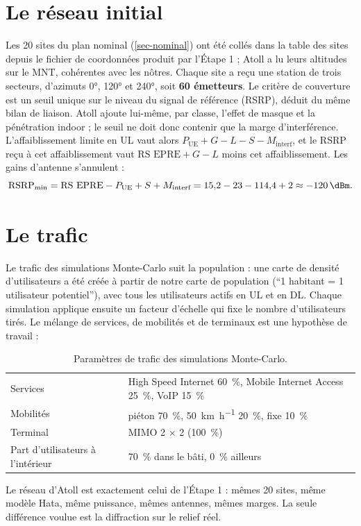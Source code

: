 \section{Le réseau initial}

Les 20 sites du plan nominal (\cref{sec-nominal}) ont été collés dans la table des sites depuis le fichier de coordonnées produit par l'Étape 1 ; Atoll a lu leurs altitudes sur le MNT, cohérentes avec les nôtres. Chaque site a reçu une station de trois secteurs, d'azimuts \ang{0}, \ang{120} et \ang{240}, soit \textbf{60 émetteurs}. Le critère de couverture est un seuil unique sur le niveau du signal de référence (RSRP), déduit du même bilan de liaison. Atoll ajoute lui-même, par classe, l'effet de masque et la pénétration indoor ; le seuil ne doit donc contenir que la marge d'interférence. L'affaiblissement limite en UL vaut alors $P_{\text{UE}} + G - L - S - M_{\text{interf}}$, et le RSRP reçu à cet affaiblissement vaut $\text{RS EPRE} + G - L$ moins cet affaiblissement. Les gains d'antenne s'annulent :
\begin{equation}
  \text{RSRP}_{\min} = \text{RS EPRE} - P_{\text{UE}} + S + M_{\text{interf}} = 15{,}2 - 23 - 114{,}4 + 2 \approx \SI{-120}{\dBm}.
\end{equation}

\section{Le trafic}

Le trafic des simulations Monte-Carlo suit la population : une carte de densité d'utilisateurs a été créée à partir de notre carte de population (\enquote{1 habitant = 1 utilisateur potentiel}), avec tous les utilisateurs actifs en UL et en DL. Chaque simulation applique ensuite un facteur d'échelle qui fixe le nombre d'utilisateurs tirés. Le mélange de services, de mobilités et de terminaux est une hypothèse de travail :

\begin{table}[H]
\centering
\caption{Paramètres de trafic des simulations Monte-Carlo.}
\label{tab-mix}
\begin{tabularx}{\textwidth}{@{}lL@{}}
\toprule
{} &  \\
\midrule
Services & High Speed Internet \SI{60}{\percent}, Mobile Internet Access \SI{25}{\percent}, VoIP \SI{15}{\percent} \\
Mobilités & piéton \SI{70}{\percent}, \SI{50}{\kilo\metre\per\hour} \SI{20}{\percent}, fixe \SI{10}{\percent} \\
Terminal & MIMO 2 × 2 (\SI{100}{\percent}) \\
Part d'utilisateurs à l'intérieur & \SI{70}{\percent} dans le bâti, \SI{0}{\percent} ailleurs \\
\bottomrule
\end{tabularx}
\end{table}

\begin{retenir}
Le réseau d'Atoll est exactement celui de l'Étape 1 : mêmes 20 sites, même modèle Hata, même puissance, mêmes antennes, mêmes marges. La seule différence voulue est la diffraction sur le relief réel.
\end{retenir}
